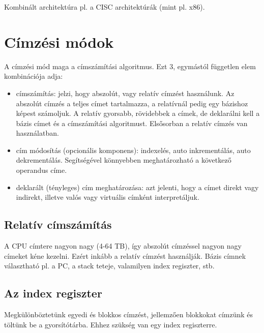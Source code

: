 Kombinált architektúra pl. a CISC architektúrák (mint pl. x86).

\section{Címzési módok}
A címzési mód maga a címszámítási algoritmus.
Ezt 3, egymástól független elem kombinációja adja:
\begin{itemize}
    \item címszámítás: jelzi, hogy abszolút, vagy relatív címzést használunk. Az abszolút címzés a teljes címet tartalmazza, a relatívnál pedig egy bázishoz képest számoljuk. A relatív gyorsabb, rövidebbek a címek, de deklarálni kell a bázis címet és a címszámítási algoritmust. Elsősorban a relatív címzés van használatban.
    \item cím módosítás (opcionális komponens): indexelés, auto inkrementálás, auto dekrementálás. Segítségével könnyebben meghatározható a következő operandus címe.
    \item deklarált (tényleges) cím meghatározása: azt jelenti, hogy a címet direkt vagy indirekt, illetve valós vagy virtuális címként interpretáljuk.
\end{itemize}

\subsection{Relatív címszámítás}
A CPU címtere nagyon nagy (4-64 TB), így abszolút címzéssel nagyon nagy címeket kéne kezelni.
Ezért inkább a relatív címzést használják.
Bázis címnek választható pl. a PC, a stack teteje, valamilyen index regiszter, stb.

\subsection{Az index regiszter}
Megkülönböztetünk egyedi és blokkos címzést, jellemzően blokkokat címzünk és töltünk be a gyorsítótárba.
Ehhez szükség van egy index regiszterre.